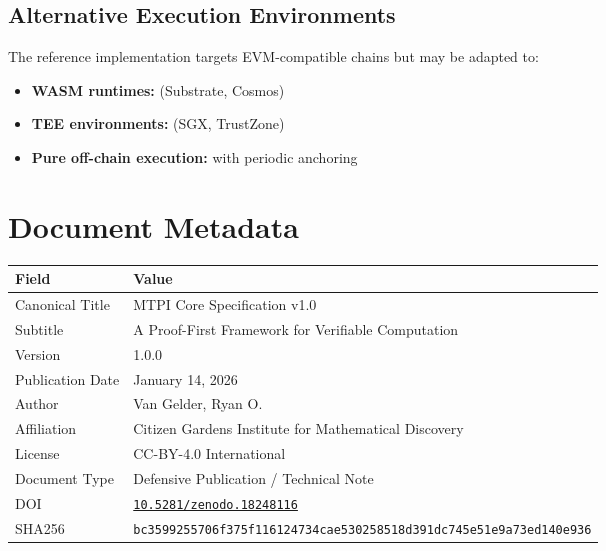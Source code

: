 \documentclass[11pt,a4paper]{article}
\begin{document}
\subsection{Alternative Execution Environments}

The reference implementation targets EVM-compatible chains but may be adapted to:
\begin{itemize}[noitemsep]
    \item \textbf{WASM runtimes:} (Substrate, Cosmos)
    \item \textbf{TEE environments:} (SGX, TrustZone)
    \item \textbf{Pure off-chain execution:} with periodic anchoring
\end{itemize}

\section*{Document Metadata}

\begin{table}[h]
\centering
\begin{tabular}{@{}ll@{}}
\toprule
\textbf{Field} & \textbf{Value} \\ \midrule
Canonical Title & MTPI Core Specification v1.0 \\
Subtitle & A Proof-First Framework for Verifiable Computation \\
Version & 1.0.0 \\
Publication Date & January 14, 2026 \\
Author & Van Gelder, Ryan O. \\
Affiliation & Citizen Gardens Institute for Mathematical Discovery \\
License & CC-BY-4.0 International \\
Document Type & Defensive Publication / Technical Note \\
DOI & \href{https://doi.org/10.5281/zenodo.18248116}{\texttt{10.5281/zenodo.18248116}} \\
SHA256 & \texttt{bc3599255706f375f116124734cae530258518d391dc745e51e9a73ed140e936} \\
\bottomrule
\end{tabular}
\end{table}
\end{document}
